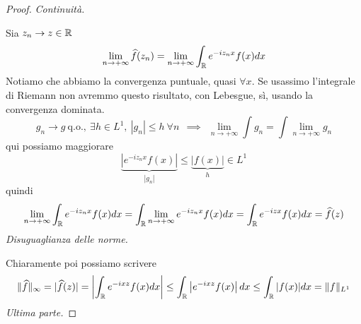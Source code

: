 \begin{proof}

\textit{Continuità.}

Sia $z_{n}\rightarrow z\in \mathbb{R}$
\begin{equation*}
\lim\limits_{n\rightarrow + \infty}\widehat{f}(z_{n}) = \lim\limits_{n\rightarrow + \infty}\int_{\mathbb{R}} e^{- iz_{n} x} f(x) dx
\end{equation*}
Notiamo che abbiamo la convergenza puntuale, quasi $\forall x$. Se usassimo l'integrale di Riemann non avremmo questo risultato, con Lebesgue, sì, usando la convergenza dominata.
\begin{equation*}
g_{n}\rightarrow g\ \text{q.o.}, \ \exists h\in L^{1}, \ | g_{n}| \leq h\ \forall n\ \ \implies \ \ \lim\limits_{n\rightarrow + \infty}\int g_{n} = \int \lim\limits_{n\rightarrow + \infty} g_{n}
\end{equation*}
qui possiamo maggiorare
\begin{equation*}
\underbrace{\left| e^{- iz_{n} x} f(x)\right|}_{| g_{n}|} \leq \underbrace{| f(x)|}_{h} \in L^{1}
\end{equation*}
quindi
\begin{equation*}
\lim\limits_{n\rightarrow + \infty}\int_{\mathbb{R}} e^{- iz_{n} x} f(x) dx = \int_{\mathbb{R}}\lim\limits_{n\rightarrow + \infty} e^{- iz_{n} x} f(x) dx = \int_{\mathbb{R}} e^{- izx} f(x) dx = \widehat{f}(z)
\end{equation*}
\textit{Disuguaglianza delle norme.}

Chiaramente poi possiamo scrivere
\begin{equation*}
\Vert \widehat{f} \Vert_{\infty} = | \widehat{f}(z)| = \left| \int_{\mathbb{R}} e^{- ixz} f(x) dx\right| \leq \int_{\mathbb{R}}\left| e^{- ixz} f(x)\right| dx \leq \int_{\mathbb{R}}| f(x)| dx = \Vert f \Vert_{L^{1}}
\end{equation*}
\textit{Ultima parte.}


\end{proof}
